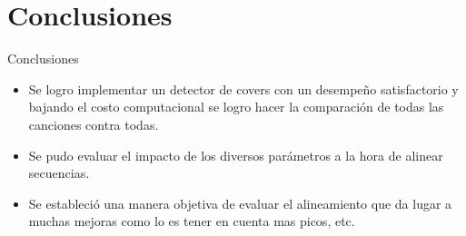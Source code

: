 \documentclass{beamer}
\begin{document}
\section{Conclusiones}
\begin{frame}{Conclusiones}
\begin{itemize}
    \item Se logro implementar un detector de covers con un desempeño satisfactorio y bajando el costo computacional se logro hacer la comparación de todas las canciones contra todas.
    \item Se pudo evaluar el impacto de los diversos parámetros a la hora de alinear secuencias.
    \item Se estableció una manera objetiva de evaluar el alineamiento que da lugar a muchas mejoras como lo es tener en cuenta mas picos, etc.
    
\end{itemize}
    
\end{frame}
\end{document}
